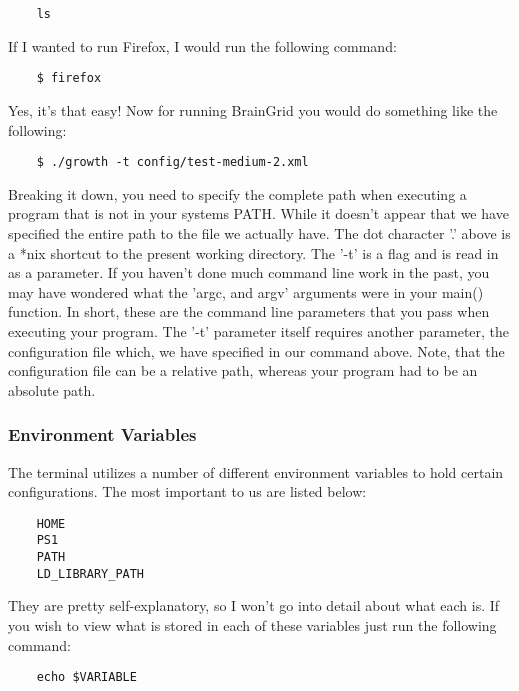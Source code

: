 	\begin{lstlisting}
	ls
	\end{lstlisting}

\mdseries \noindent If I wanted to run Firefox, I would run the following command:

	\begin{lstlisting}
	$ firefox
	\end{lstlisting}

\mdseries \noindent Yes, it's that easy!  Now for running BrainGrid you would do something like the following:

	\begin{lstlisting}
	$ ./growth -t config/test-medium-2.xml
	\end{lstlisting}
	
\mdseries \noindent Breaking it down, you need to specify the complete path when executing a program that is not in your systems PATH.  While it doesn't appear that we have specified the entire path to the file we actually have.  The dot character '.' above is a *nix shortcut to the present working directory.  The '-t' is a flag and is read in as a parameter.  If you haven't done much command line work in the past, you may have wondered what the 'argc, and argv' arguments were in your main() function.  In short, these are the command line parameters that you pass when executing your program.  The '-t' parameter itself requires another parameter, the configuration file which, we have specified in our command above.  Note, that the configuration file can be a relative path, whereas your program had to be an absolute path.


\subsubsection{Environment Variables} \mdseries 
\mdseries \noindent The terminal utilizes a number of different environment variables to hold certain configurations.  The most important to us are listed below:
	\begin{lstlisting}
	HOME
	PS1
	PATH
	LD_LIBRARY_PATH
	\end{lstlisting}
	
\mdseries \noindent They are pretty self-explanatory, so I won't go into detail about what each is.  If you wish to view what is stored in each of these variables just run the following command:

	\begin{lstlisting}
	echo $VARIABLE
	\end{lstlisting}
	
